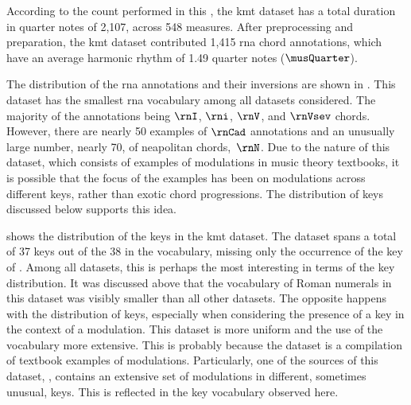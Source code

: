 
According to the count performed in this \thesisdiss{}, the
\gls{kmt} dataset has a total duration in quarter notes of
2,107, across 548 measures. After preprocessing and
preparation, the \gls{kmt} dataset contributed 1,415
\gls{rna} chord annotations, which have an average harmonic
rhythm of 1.49 quarter notes ($\musQuarter$).

The distribution of the \gls{rna} annotations and their
inversions are shown in . This
dataset has the smallest \gls{rna} vocabulary among all
datasets considered. The majority of the annotations being
$\rnI$, $\rni$, $\rnV$, and $\rnVsev$ chords. However, there
are nearly 50 examples of $\rnCad$ annotations and an
unusually large number, nearly 70, of \gls{neapolitan}
chords,~$\rnN$. Due to the nature of this dataset, which
consists of examples of modulations in music theory
textbooks, it is possible that the focus of the examples has
been on modulations across different keys, rather than
exotic chord progressions. The distribution of keys
discussed below supports this idea.



 shows the distribution of the keys
in the \gls{kmt} dataset. The dataset spans a total of 37
keys out of the 38 in the vocabulary, missing only the
occurrence of the key of \keyBbb{}. Among all datasets, this
is perhaps the most interesting in terms of the key
distribution. It was discussed above that the vocabulary of
Roman numerals in this dataset was visibly smaller than all
other datasets. The opposite happens with the distribution
of keys, especially when considering the presence of a key
in the context of a modulation. This dataset is more uniform
and the use of the vocabulary more extensive. This is
probably because the dataset is a compilation of textbook
examples of modulations. Particularly, one of the sources of
this dataset, \textcite{reger1904supplement}, contains an
extensive set of modulations in different, sometimes
unusual, keys. This is reflected in the key vocabulary
observed here.
